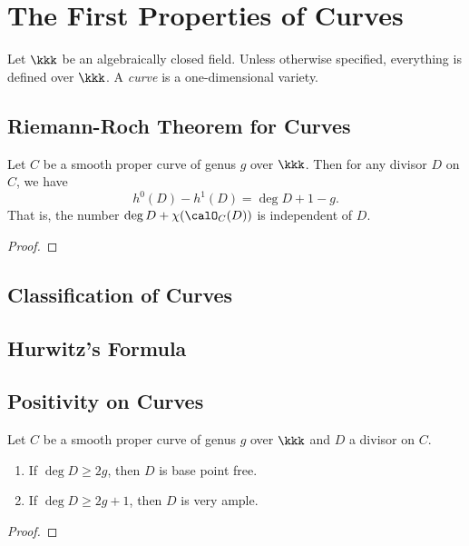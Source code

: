 \section{The First Properties of Curves}

Let \(\kkk\) be an algebraically closed field. 
Unless otherwise specified, everything is defined over \(\kkk\).
A \emph{curve} is a one-dimensional variety.

\subsection{Riemann-Roch Theorem for Curves}

    \begin{theorem}\label{thm:Riemann-Roch_Theorem_for_Curves}
        Let \(C\) be a smooth proper curve of genus \(g\) over \(\kkk\).
        Then for any divisor \(D\) on \(C\), we have
        \[ h^0(D) - h^1(D) = \deg D + 1 - g. \]
        That is, the number \(\deg D + \chi(\calO_C(D))\) is independent of \(D\).
    \end{theorem}
    \begin{proof}
    \end{proof}

\subsection{Classification of Curves}


\subsection{Hurwitz's Formula}

    \begin{theorem}\label{thm:Hurwitz_Formula}
    \end{theorem}


\subsection{Positivity on Curves}

    \begin{theorem}\label{thm:bpf_and_very_ample_divisor_on_curve}
        Let \(C\) be a smooth proper curve of genus \(g\) over \(\kkk\) and \(D\) a divisor on \(C\).
        \begin{enumerate}
            \item If \(\deg D \geq 2g\), then \(D\) is base point free.
            \item If \(\deg D \geq 2g + 1\), then \(D\) is very ample.
        \end{enumerate}
    \end{theorem}
    \begin{proof}
    \end{proof}
